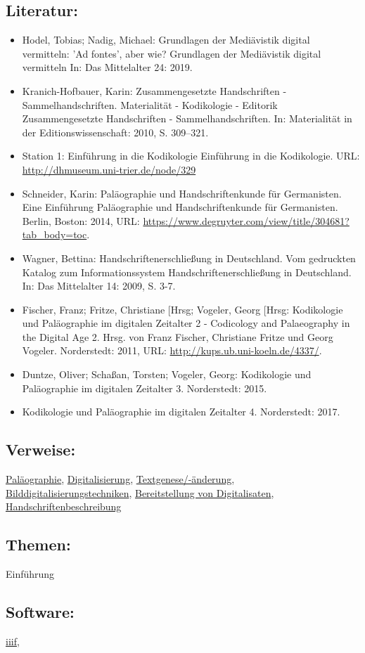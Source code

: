 \documentclass{article}
\begin{document}
        \subsection*{Literatur:}\begin{itemize}\item Hodel, Tobias; Nadig, Michael: Grundlagen der Mediävistik digital vermitteln: 'Ad fontes', aber wie? Grundlagen der Mediävistik digital vermitteln In: Das Mittelalter 24: 2019.\item Kranich-Hofbauer, Karin: Zusammengesetzte Handschriften - Sammelhandschriften. Materialität - Kodikologie - Editorik Zusammengesetzte Handschriften - Sammelhandschriften. In: Materialität in der Editionswissenschaft: 2010, S. 309–321.\item Station 1: Einführung in die Kodikologie Einführung in die Kodikologie. URL: \url{http://dhmuseum.uni-trier.de/node/329}\item Schneider, Karin: Paläographie und Handschriftenkunde für Germanisten. Eine Einführung Paläographie und Handschriftenkunde für Germanisten. Berlin, Boston: 2014, URL: \url{https://www.degruyter.com/view/title/304681?tab_body=toc}.\item Wagner, Bettina: Handschriftenerschließung in Deutschland. Vom gedruckten Katalog zum Informationssystem Handschriftenerschließung in Deutschland. In: Das Mittelalter 14: 2009, S. 3-7.\item Fischer, Franz; Fritze, Christiane [Hrsg; Vogeler, Georg [Hrsg: Kodikologie und Paläographie im digitalen Zeitalter 2 - Codicology and Palaeography in the Digital Age 2. Hrsg. von Franz Fischer, Christiane Fritze und Georg Vogeler. Norderstedt: 2011, URL: \url{http://kups.ub.uni-koeln.de/4337/}.\item Duntze, Oliver; Schaßan, Torsten; Vogeler, Georg: Kodikologie und Paläographie im digitalen Zeitalter 3. Norderstedt: 2015.\item Kodikologie und Paläographie im digitalen Zeitalter 4. Norderstedt: 2017.\end{itemize}\subsection*{Verweise:}\href{https://gams.uni-graz.at/o:konde.155}{Paläographie}, \href{https://gams.uni-graz.at/o:konde.60}{Digitalisierung}, \href{https://gams.uni-graz.at/o:konde.28}{Textgenese/-änderung}, \href{https://gams.uni-graz.at/o:konde.37}{Bilddigitalisierungstechniken}, \href{https://gams.uni-graz.at/o:konde.36}{Bereitstellung von Digitalisaten}, \href{https://gams.uni-graz.at/o:konde.92}{Handschriftenbeschreibung}\subsection*{Themen:}Einführung\subsection*{Software:}\href{https://iiif.io/}{iiif}, 
\end{document}
